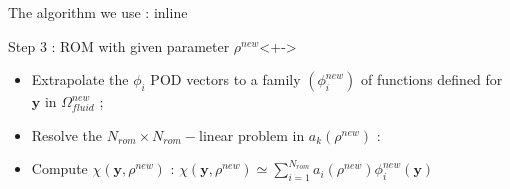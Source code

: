 \begin{frame}{The algorithm we use : inline}
%
\begin{block}{Step 3 : ROM with given parameter $\rho^{new}$}<+->
\begin{itemize}
\item<+-> Extrapolate the $\phi_i$ POD vectors to a family $(\phi_i^{new})$ of functions defined for $\mathbf{y}$ in $\Omega_{fluid}^{new}$ ;
\item<+-> Resolve the $N_{rom}\times N_{rom}-$linear problem in $a_k(\rho^{new})$ :
\end{itemize}
\begin{itemize}
\item<+-> Compute $\chi(\mathbf{y},\rho^{new})$ : $\chi\left(\mathbf{y},\rho^{new}\right)\simeq \sum\limits_{i=1}^{N_{rom}} a_i \left(\rho^{new}\right)\phi_i^{new}(\mathbf{y})$
\end{itemize}
\end{block}
%
\end{frame}
